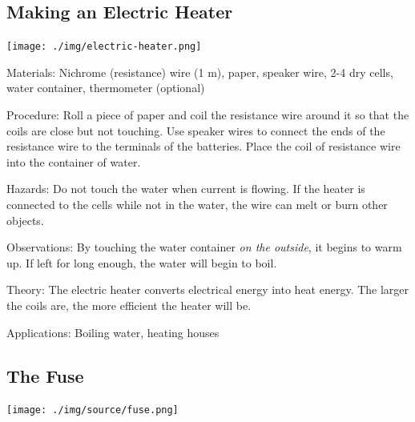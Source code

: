 \begin{multicols}{2}
\columnbreak

\subsection{Making an Electric Heater}

\begin{center}
\texttt{[image: ./img/electric-heater.png]}
\end{center}

\begin{description*}
\item[Materials:]{Nichrome (resistance) wire (1 m), paper, speaker wire, 2-4 dry cells, water container, thermometer (optional)}
\item[Procedure:]{Roll a piece of paper and coil the resistance wire around it so that the coils are close but not touching. Use speaker wires to connect the ends of the resistance wire to the terminals of the batteries. Place the coil of resistance wire into the container of water.}
\item[Hazards:]{Do not touch the water when current is flowing. If the heater is connected to the cells while not in the water, the wire can melt or burn other objects.}
\item[Observations:]{By touching the water container \emph{on the outside}, it begins to warm up. If left for long enough, the water will begin to boil.}
\item[Theory:]{The electric heater converts electrical energy into heat energy. The larger the coils are, the more efficient the heater will be.}
\item[Applications:]{Boiling water, heating houses}
\end{description*}

\subsection{The Fuse}

\begin{center}
\texttt{[image: ./img/source/fuse.png]}
\end{center}


\end{multicols}
